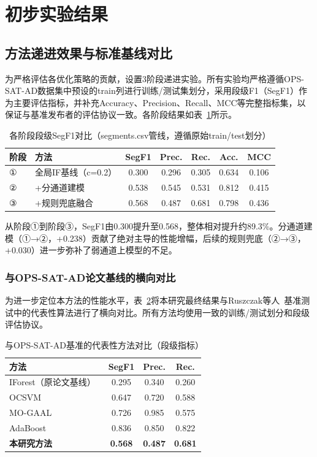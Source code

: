 \documentclass[conference]{IEEEtran}
\begin{document}
\section{初步实验结果}

\subsection{方法递进效果与标准基线对比}

为严格评估各优化策略的贡献，设置3阶段递进实验。所有实验均严格遵循OPS-SAT-AD数据集中预设的train列进行训练/测试集划分，采用段级F1（SegF1）作为主要评估指标，并补充Accuracy、Precision、Recall、MCC等完整指标集，以保证与基准发布者的评估协议一致。各阶段结果如表~\ref{tab:stages}所示。

\begin{table}[htbp]
\centering
\caption{各阶段段级SegF1对比（segments.csv管线，遵循原始train/test划分）}
\label{tab:stages}
\begin{tabular}{llccccc}
\toprule
阶段 & 方法 & SegF1 & Prec. & Rec. & Acc. & MCC \\
\midrule
① & 全局IF基线（c=0.2） & 0.300 & 0.296 & 0.305 & 0.634 & 0.106 \\
② & +分通道建模 & 0.538 & 0.545 & 0.531 & 0.812 & 0.415 \\
③ & +规则兜底融合 & 0.568 & 0.487 & 0.681 & 0.798 & 0.436 \\
\bottomrule
\end{tabular}
\end{table}

从阶段①到阶段③，SegF1由0.300提升至0.568，整体相对提升约89.3\%。分通道建模（①→②，+0.238）贡献了绝对主导的性能增幅，后续的规则兜底（②→③，+0.030）进一步弥补了弱通道上模型的不足。

\subsubsection{与OPS-SAT-AD论文基线的横向对比}

为进一步定位本方法的性能水平，表~\ref{tab:comparison}将本研究最终结果与Ruszczak等人~\cite{Ruszczak2025}基准测试中的代表性算法进行了横向对比。所有方法均使用一致的训练/测试划分和段级评估协议。

\begin{table}[htbp]
\centering
\caption{与OPS-SAT-AD基准的代表性方法对比（段级指标）}
\label{tab:comparison}
\begin{tabular}{lccc}
\toprule
方法 & SegF1 & Prec. & Rec. \\
\midrule
IForest（原论文基线）~\cite{Liu2008} & 0.295 & 0.340 & 0.260 \\
OCSVM~\cite{Scholkopf2001} & 0.647 & 0.720 & 0.588 \\
MO-GAAL & 0.726 & 0.985 & 0.575 \\
AdaBoost & 0.836 & 0.850 & 0.822 \\
\textbf{本研究方法} & \textbf{0.568} & \textbf{0.487} & \textbf{0.681} \\
\bottomrule
\end{tabular}
\end{table}
\end{document}
